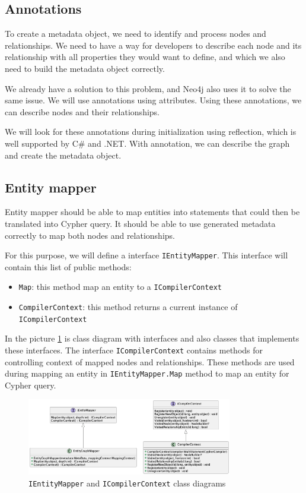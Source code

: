\subsection {Annotations}

To create a metadata object, we need to identify and process nodes and relationships. We need to have a way for developers to describe each node and its relationship with all properties they would want to define, and which we also need to build the metadata object correctly.

We already have a solution to this problem, and Neo4j also uses it to solve the same issue. We will use annotations using attributes. Using these annotations, we can describe nodes and their relationships.

We will look for these annotations during initialization using reflection, which is well supported by C\# and .NET. With annotation, we can describe the graph and create the metadata object.

\subsection {Entity mapper}

Entity mapper should be able to map entities into statements that could then be translated into Cypher query. It should be able to use generated metadata correctly
to map both nodes and relationships.

For this purpose, we will define a interface \texttt{IEntityMapper}. This interface will contain
this list of public methods:

\begin{itemize}
    \item {\texttt{Map}: this method map an entity to a \texttt{ICompilerContext}}
    \item {\texttt{CompilerContext}: this method returns a current instance of \texttt{ICompilerContext}}
\end{itemize}

In the picture \ref{fig:IEntityMapperClassDiagram} is class diagram with interfaces and also classes that implements these interfaces.
The interface \texttt{ICompilerContext} contains methods for controlling context of mapped nodes and relationships. These methods
are used during mapping an entity in \texttt{IEntityMapper.Map} method to map an entity for Cypher query.

\begin{figure}[H]
    \centering
    \includegraphics[width=0.8\textwidth]{content/entitymapper.png}
    \caption{\texttt{IEntityMapper} and \texttt{ICompilerContext} class diagrams}
    \label{fig:IEntityMapperClassDiagram}
\end{figure}


